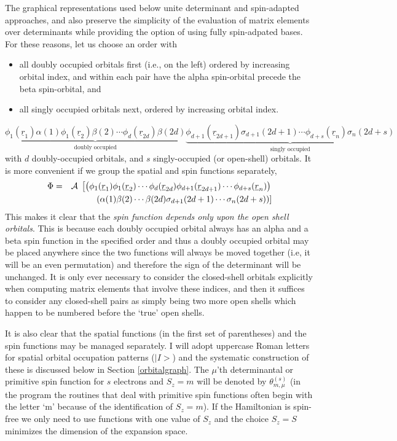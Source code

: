 \documentclass[fullpage,12pt,fleqn]{article}
\newcommand{\RNold}[1]{\underline{r}_{#1}}
\begin{document}
\label{standardorder}

The graphical representations used below unite determinant and
spin-adapted approaches, and also preserve the simplicity of the
evaluation of matrix elements over determinants while providing the
option of using fully spin-adpated bases.  For these reasons, let us
choose an order with
\begin{itemize}
\item all doubly occupied orbitals first (i.e., on the left) ordered
by increasing orbital index, and within each pair have the alpha
spin-orbital precede the beta spin-orbital, and
\item all singly occupied orbitals next, ordered by increasing orbital
index.
\end{itemize}
\begin{equation}
\underbrace{\phi_{1}(\RNold{1})\alpha(1)\phi_{1}(\RNold{2})\beta(2) \cdots
\phi_{d}(\RNold{2d})\beta(2d)}_{\mbox{doubly occupied}}
\underbrace{\phi_{d+1}(\RNold{2d+1})\sigma_{d+1}(2d+1) \cdots 
\phi_{d+s}(\RNold{n})\sigma_{n}(2d+s)}_{\mbox{singly occupied}}
\end{equation}
with $d$ doubly-occupied orbitals, and $s$ singly-occupied (or
open-shell) orbitals.  
It is more convenient if we group the spatial and spin
functions separately,
\begin{eqnarray}
\Phi & = & {\cal A} \; \left[
\left(\phi_{1}(\RNold{1})\phi_{1}(\RNold{2}) \cdots \phi_{d}(\RNold{2d})
\phi_{d+1}(\RNold{2d+1}) \cdots \phi_{d+s}(\RNold{n}) \right)\right. \\
 & & \left.\left(\alpha(1)\beta(2) \cdots \beta(2d) \sigma_{d+1}(2d+1) \cdots 
\sigma_{n}(2d+s)\right)\right]
\end{eqnarray}
This makes it clear that the {\em spin function depends only upon the
open shell orbitals}.  This is because each doubly occupied orbital
always has an alpha and a beta spin function in the specified order
and thus a doubly occupied orbital may be placed anywhere since the
two functions will always be moved together (i.e, it will be an even
permutation) and therefore the sign of the determinant will be
unchanged.  It is only ever necessary to consider the closed-shell
orbitals explicitly when computing matrix elements that involve these
indices, and then it suffices to consider any closed-shell pairs as
simply being two more open shells which happen to be numbered before
the `true' open shells.

It is also clear that the spatial functions (in the first set of
parentheses) and the spin functions may be managed separately.  I will
adopt uppercase Roman letters for spatial orbital occupation patterns
($|I\! >$) and the systematic construction of these is discussed below
in Section \ref{orbitalgraph}.  The $\mu$'th determinantal or
primitive spin function for $s$ electrons and $S_z = m$ will be
denoted by $\theta^{(s)}_{m,\mu}$ (in the program the routines that
deal with primitive spin functions often begin with the letter `m'
because of the identification of $S_z = m$).  If the Hamiltonian is
spin-free we only need to use functions with one value of $S_z$ and
the choice $S_z=S$ minimizes the dimension of the expansion space.
\end{document}

